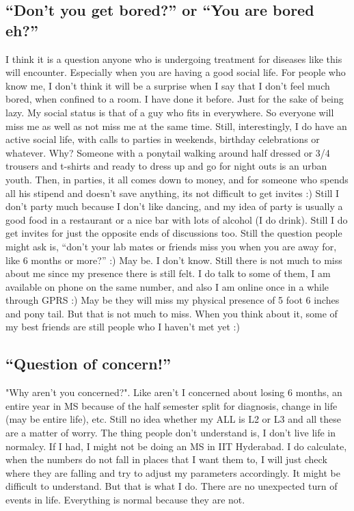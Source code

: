\subsection*{``Don't you get bored?'' or ``You are bored eh?''} 

I think it is a question anyone who is undergoing treatment for diseases like this will encounter. 
Especially when you are having a good social life. For people who know me, I don't think it
will be a surprise when I say that I don't feel much bored, when confined to a room. I have done it before.
Just for the sake of being lazy. My social status is that of a guy who fits in everywhere. So 
everyone will miss me as well as not miss me at the same time. Still, interestingly, I do have an active
social life, with calls to parties in weekends, birthday celebrations or whatever. Why? Someone
with a ponytail walking around half dressed or 3/4 trousers and t-shirts and ready to dress up and 
go for night outs is an urban youth. Then, in parties, it all comes down to money, and for 
someone who spends all his stipend and doesn't save anything, its not difficult to get invites
:) Still I don't party much because I don't like dancing, and my idea of party is usually a good
food in a restaurant or a nice bar with lots of alcohol (I do drink). Still I do get invites
for just the opposite ends of discussions too. Still the question people might ask is, ``don't
your lab mates or friends miss you when you are away for, like 6 months or more?'' :) May be. I don't
know. Still there is not much to miss about me since my presence there is still felt. I do
talk to some of them, I am available on phone on the same number, and also I am online once in a while
through GPRS :) May be they will miss my physical presence of 5 foot 6 inches and pony tail. But
that is not much to miss. When you think about it, some of my best friends are still people who I
haven't met yet :) 

\subsection*{``Question of concern!''} 

"Why aren't you concerned?". Like aren't I concerned about losing 6 months, an entire year in MS because of the half 
semester split for diagnosis, change in life (may be entire life), etc. Still no idea whether my
ALL is L2 or L3 and all these are a matter of worry. The thing people don't understand is, I 
don't live life in normalcy. If I had, I might not be doing an MS in IIT Hyderabad. I do 
calculate, when the numbers do not fall in places that I want them to, I will just check where they are 
falling and try to adjust my parameters accordingly. It might be difficult to understand. But
that is what I do. There are no unexpected turn of events in life. Everything is normal because
they are not.

